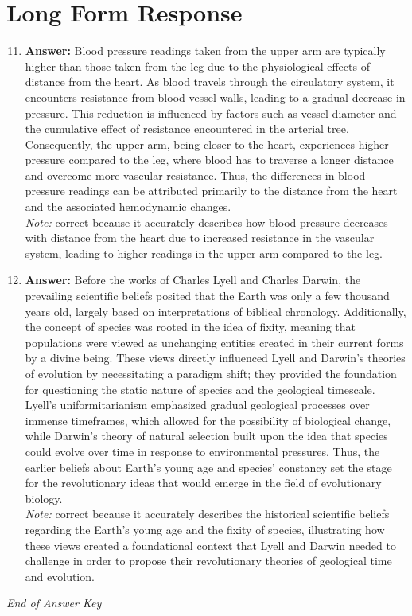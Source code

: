 \documentclass[12pt]{article}
\begin{document}
\section*{Long Form Response}
\begin{enumerate}[label=\arabic*.]
\setcounter{enumi}{10}
\item \textbf{Answer:} Blood pressure readings taken from the upper arm are typically higher than those taken from the leg due to the physiological effects of distance from the heart. As blood travels through the circulatory system, it encounters resistance from blood vessel walls, leading to a gradual decrease in pressure. This reduction is influenced by factors such as vessel diameter and the cumulative effect of resistance encountered in the arterial tree. Consequently, the upper arm, being closer to the heart, experiences higher pressure compared to the leg, where blood has to traverse a longer distance and overcome more vascular resistance. Thus, the differences in blood pressure readings can be attributed primarily to the distance from the heart and the associated hemodynamic changes.
\\ \textit{Note:} correct because it accurately describes how blood pressure decreases with distance from the heart due to increased resistance in the vascular system, leading to higher readings in the upper arm compared to the leg.
\item \textbf{Answer:} Before the works of Charles Lyell and Charles Darwin, the prevailing scientific beliefs posited that the Earth was only a few thousand years old, largely based on interpretations of biblical chronology. Additionally, the concept of species was rooted in the idea of fixity, meaning that populations were viewed as unchanging entities created in their current forms by a divine being. These views directly influenced Lyell and Darwin's theories of evolution by necessitating a paradigm shift; they provided the foundation for questioning the static nature of species and the geological timescale. Lyell's uniformitarianism emphasized gradual geological processes over immense timeframes, which allowed for the possibility of biological change, while Darwin's theory of natural selection built upon the idea that species could evolve over time in response to environmental pressures. Thus, the earlier beliefs about Earth's young age and species' constancy set the stage for the revolutionary ideas that would emerge in the field of evolutionary biology.
\\ \textit{Note:} correct because it accurately describes the historical scientific beliefs regarding the Earth's young age and the fixity of species, illustrating how these views created a foundational context that Lyell and Darwin needed to challenge in order to propose their revolutionary theories of geological time and evolution.
\end{enumerate}

\vfill
\noindent\textit{End of Answer Key}
\end{document}
